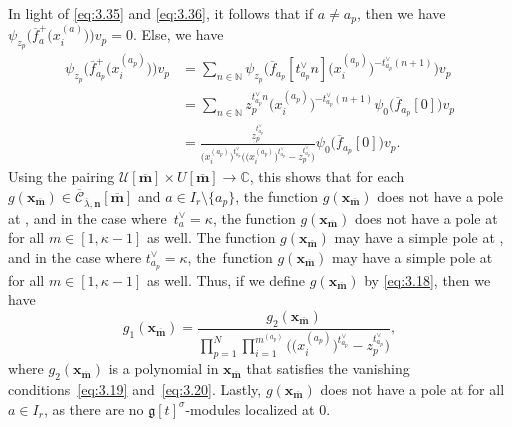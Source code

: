 \documentclass[10pt,a4paper]{amsart}
\numberwithin{equation}{section}
\begin{document}
\begin{enumerate}
\begin{equation*}
\end{equation*}
In light of \eqref{eq:3.35} and \eqref{eq:3.36}, it follows that if $a\neq a_p$, then we have $\psi_{z_p}\bigl(\overline{ f}_a^+\bigl(x_i^{(a)}\bigr)\bigr)v_p=0$. Else, we have
\begin{align}
\psi_{z_p}\bigl(\overline{f}_{a_p}^+\bigl(x_i^{(a_p)}\bigr)\bigr)v_p
&=\sum_{n\in\mathbb{N}}\psi_{z_p}\bigl(\overline{f}_{a_p}[t_{a_p}^{\vee}n]\bigl(x_i^{(a_p)}\bigr)^{-t_{a_p}^{\vee}(n+1)}\bigr)v_p\nonumber\\
&=\sum_{n\in\mathbb{N}}z_p^{t_{a_p}^{\vee}n}\bigl(x_i^{(a_p)}\bigr)^{-t_{a_p}^{\vee}(n+1)}\psi_0\bigl(\overline{f}_{a_p}[0]\bigr)v_p\nonumber\\
&=\frac{z_p^{t_{a_p}^{\vee}}}{\bigl(x_i^{(a_p)}\bigr)^{t_{a_p}^{\vee}}\bigl(\bigl(x_i^{(a_p)}\bigr)^{t_{a_p}^{\vee}}-z_p^{t_{a_p}^{\vee}}\bigr)}\psi_0\bigl( \overline{f}_{a_p}[0]\bigr)v_p.\label{eq:3.37}
\end{align}
Using the pairing $\mathcal{U}[\overline{\mathbf{m}}]\times U[\overline{\mathbf{m}}]\to\mathbb{C}$, this shows that for each $g(\mathbf{x}_{\overline{\mathbf{m}}})\in\overline{ \mathcal{C}}_{\overline{\lambda},\mathbf{n}}[\overline{ \mathbf{m}}]$ and $a\in I_r\setminus\{a_p\}$, the function $g(\mathbf{x}_{\overline{\mathbf{m}}})$ does not have a pole at , and in the case where~${t_a^{\vee}= \kappa}$, the function $g(\mathbf{x}_{\overline{\mathbf{m}}})$ does not have a pole at  for all $m\in[1,\kappa-1]$ as well. The function $g(\mathbf{x}_{ \overline{\mathbf{m}}})$ may have a simple pole at , and in the case where $t_{a_p}^{\vee}= \kappa$, the~function $g(\mathbf{x}_{\overline{\mathbf{ m}}})$ may have a simple pole at  for all $m\in[1,\kappa-1]$ as well. Thus, if we define $g(\mathbf{x}_{\overline{\mathbf{m}}})$ by \eqref{eq:3.18}, then we have
\begin{equation}\label{eq:3.38}
g_1(\mathbf{x}_{\overline{\mathbf{m}}})
=\frac{g_2(\mathbf{x}_{\overline{\mathbf{m}}})}{  \prod_{p=1}^N\prod_{i=1}^{m^{(a_p)}}\bigl(\bigl(x_i^{(a_p)}\bigr)^{t_{a_p} ^{\vee}}-z_p^{t_{a_p}^{\vee}}\bigr)},
\end{equation}
where $g_2(\mathbf{x}_{\overline{\mathbf{m}}})$ is a polynomial in $\mathbf{x}_{\overline{\mathbf{m}}}$ that satisfies the vanishing conditions~\eqref{eq:3.19} and~\eqref{eq:3.20}. Lastly, $g(\mathbf{x}_{\overline{ \mathbf{m}}})$ does not have a pole at  for all $a\in I_r$, as there are no $\mathfrak{g}[t]^{\sigma}$-modules localized at $0$.

\end{enumerate}
\end{document}
